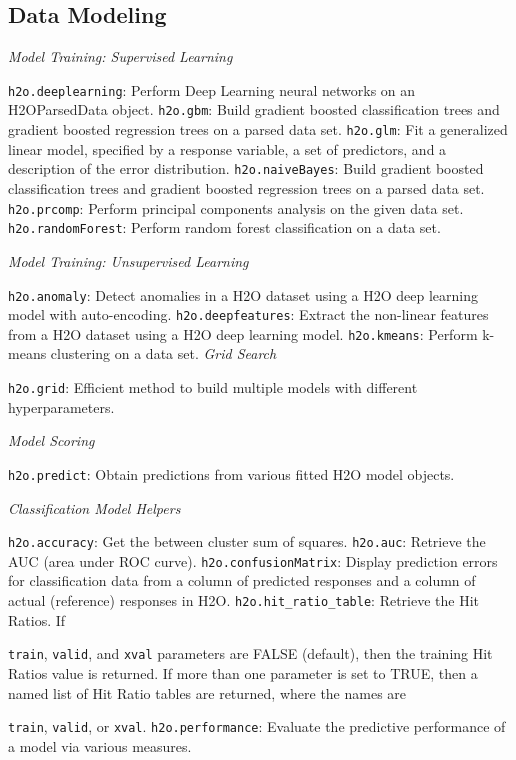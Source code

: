 {{\subsection{Data Modeling}

\medskip
\emph{Model Training: Supervised Learning}\par
{\texttt{h2o.deeplearning}}: Perform Deep Learning neural networks on an\\ H2OParsedData object. 
{\texttt{h2o.gbm}}: Build gradient boosted classification trees and gradient boosted regression trees on a parsed data set.  
{\texttt{h2o.glm}}: Fit a generalized linear model, specified by a response variable, a set of predictors, and a description of the error distribution.  
{\texttt{h2o.naiveBayes}}: Build gradient boosted classification trees and gradient boosted regression trees on a parsed data set. 
{\texttt{h2o.prcomp}}: Perform principal components analysis on the given data set.  
{\texttt{h2o.randomForest}}: Perform random forest classification on a data set. 

\medskip
\emph{Model Training: Unsupervised Learning}\par
{\texttt{h2o.anomaly}}: Detect anomalies in a H2O dataset using a H2O deep learning model with auto-encoding. 
{\texttt{h2o.deepfeatures}}: Extract the non-linear features from a H2O dataset using a H2O deep learning model. 
{\texttt{h2o.kmeans}}: Perform k-means clustering on a data set.  
\medskip
\emph{Grid Search}\par
{\texttt{h2o.grid}}: Efficient method to build multiple models with different hyperparameters.  

\medskip
\emph{Model Scoring}\par
{\texttt{h2o.predict}}: Obtain predictions from various fitted H2O model objects. 

\medskip
\emph{Classification Model Helpers}\par
{\texttt{h2o.accuracy}}: Get the between cluster sum of squares. 
{\texttt{h2o.auc}}: Retrieve the AUC (area under ROC curve). 
{\texttt{h2o.confusionMatrix}}: Display prediction errors for classification data from a column of predicted responses and a column of actual (reference) responses in H2O. 
{\texttt{h2o.hit\_ratio\_table}}: Retrieve the Hit Ratios. If {\texttt{train}, {\texttt{valid}}, and {\texttt{xval}} parameters are FALSE (default), then the training Hit Ratios value is returned. If more than one parameter is set to TRUE, then a named list
of Hit Ratio tables are returned, where the names are {\texttt{train}, {\texttt{valid}}, or {\texttt{xval}}. 
{\texttt{h2o.performance}}: Evaluate the predictive performance of a model via various measures. 

}}}}

